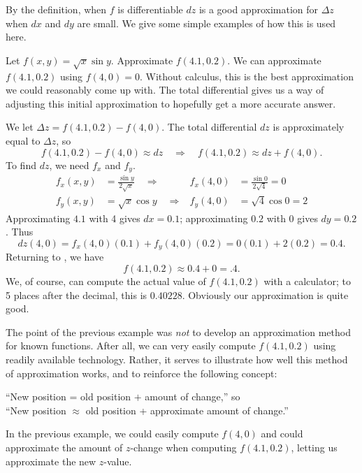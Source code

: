 By the definition, when $f$ is differentiable $dz$ is a good approximation for $\Delta z$ when $dx$ and $dy$ are small. We give some simple examples of how this is used here.

\begin{example}\label{ex_totaldiff2}
Let $f(x,y)=\sqrt{x}\sin y$. Approximate $f(4.1,0.2)$.
\solution
We can approximate $f(4.1,0.2)$ using $f(4,0)=0$. Without calculus, this is the best approximation we could reasonably come up with. The total differential gives us a way of adjusting this initial approximation to hopefully get a more accurate answer.

We let $\Delta z = f(4.1,0.2) - f(4,0)$. The total differential $dz$ is approximately equal to $\Delta z$, so
\begin{equation}
f(4.1,0.2) - f(4,0) \approx dz
\quad \Rightarrow \quad
f(4.1,0.2) \approx dz + f(4,0).\label{eq:totaldiff2}
\end{equation}
To find $dz$, we need $f_x$ and $f_y$.
\begin{align*}
f_x(x,y) &= \frac{\sin y}{2\sqrt{x}} \quad\Rightarrow&
f_x(4,0) &= \frac{\sin0}{2\sqrt{4}}=0 \\
f_y(x,y) &= \sqrt{x}\cos y \quad\Rightarrow&
f_y(4,0) &= \sqrt{4}\cos0=2
\end{align*}
Approximating $4.1$ with 4 gives $dx = 0.1$; approximating $0.2$ with $0$ gives $dy=0.2$. Thus
\[
dz(4,0) = f_x(4,0)(0.1) + f_y(4,0)(0.2)
=0(0.1) + 2(0.2)
=0.4.
\]
Returning to , we have
\[f(4.1,0.2) \approx 0.4 + 0 = .4.\]
We, of course, can compute the actual value of $f(4.1,0.2)$ with a calculator; to 5 places after the decimal, this is $0.40228$. Obviously our approximation is quite good.
\end{example}

The point of the previous example was \emph{not} to develop an approximation method for known functions. After all, we can very easily compute $f(4.1,0.2)$ using readily available technology. Rather, it serves to illustrate how well this method of approximation works, and to reinforce the following concept:
\begin{center}
	``New position = old position $+$ amount of change,'' so\\
	``New position $\approx$ old position + approximate amount of change.''
\end{center}

In the previous example, we could easily compute $f(4,0)$ and could approximate the amount of $z$-change when computing $f(4.1,0.2)$, letting us approximate the new $z$-value.

